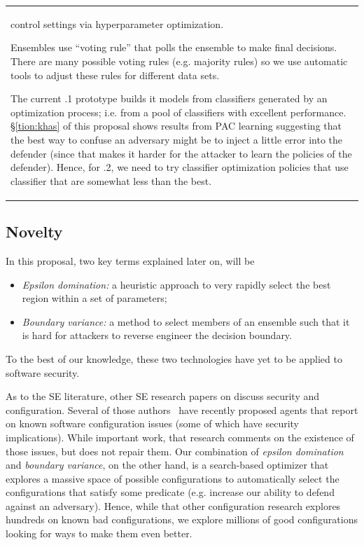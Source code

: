 \documentclass{NSF}
\newenvironment{myitemize}
{ \begin{itemize}[topsep=0pt,bottomsep=0pt,itemsep=0,leftmargin=*]
    \setlength{\itemsep}{0pt}
    \setlength{\parskip}{0pt}
    \setlength{\parsep}{0pt}     }
{ \end{itemize}                  }
\newcommand{\bi}{\begin{myitemize}}
\newcommand{\ei}{\end{myitemize}}
\newcommand{\tion}[1]{\S\ref{tion:#1}}
\newcommand{\IT}{{\sffamily {\em MASS~CONFUSION}}}
\begin{document}
\begin{nsfdescription}
\begin{table}
\begin{tabular}{|p{.98\linewidth}|}
  control  settings via hyperparameter optimization.
\item[\ding{187}]   Ensembles use ``voting rule'' that polls the ensemble   to make final decisions. There are many possible voting rules (e.g. majority rules) so we use automatic tools to adjust these rules for   different data sets.
\item[\ding{188}] The current {\IT}.1 prototype builds it models from classifiers generated by an optimization process; i.e. from a pool of 
classifiers with excellent performance. 
\tion{khas}  of this proposal
shows results from PAC learning suggesting that the best way to confuse an adversary might be to inject a little error into the defender (since that makes it harder    for  the  attacker  to  learn  the  policies  of  the  defender).  Hence, for
{\IT}.2, we need to try classifier optimization policies that use classifier that are somewhat less than the best. 
\ei
\end{tabular}\hline
\end{table}

\subsection{Novelty}
In this proposal, two key terms  explained
later on, will be
\bi
\item {\em Epsilon domination:}
a heuristic approach to very rapidly select the best region within a set of parameters;
\item {\em Boundary variance:}
a method to select members of an ensemble such that  it is hard for attackers to reverse engineer the decision boundary.
\ei
To the best of our knowledge, these two technologies have yet to be applied  to software security.
 
 As to the SE literature, 
 other SE research papers on discuss
 security  and configuration.
 Several of those  authors~\cite{Hilton2017TradeoffsIC,8360943,vassallo_carmine_2020_3860985,rahman2019seven} have recently proposed agents that report on    known software configuration
 issues (some of which have  security implications). While important work, that research comments 
 on the existence of
 those issues, but does not repair them. 
Our combination of
{\em epsilon domination}
and {\em boundary variance}, on the other hand, is a search-based optimizer
 that explores a massive space of   possible configurations  to automatically select the configurations that satisfy some predicate
 (e.g. increase our ability to defend  against an adversary). Hence, while that other configuration
 research explores hundreds on known bad configurations, we explore millions of good configurations
 looking for ways to make them even better.
 

\end{nsfdescription}
\end{document}
